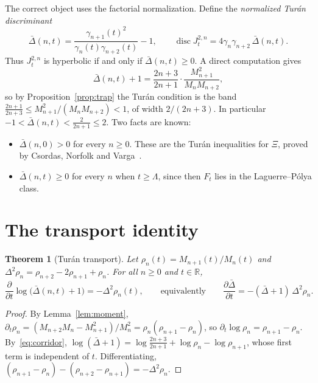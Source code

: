 \documentclass[11pt,a4paper]{article}
\newtheorem{theorem}{Theorem}
\theoremstyle{remark}
\begin{document}
The correct object uses the factorial normalization. Define the
\emph{normalized Tur\'an discriminant}
\begin{equation}
\bar\Delta(n,t)=\frac{\gamma_{n+1}(t)^2}{\gamma_n(t)\gamma_{n+2}(t)}-1,
\qquad
\operatorname{disc}J^{2,n}_t=4\gamma_n\gamma_{n+2}\,\bar\Delta(n,t).
\end{equation}
Thus $J^{2,n}_t$ is hyperbolic if and only if $\bar\Delta(n,t)\ge0$. A direct
computation gives
\begin{equation}\label{eq:corridor}
\bar\Delta(n,t)+1=\frac{2n+3}{2n+1}\cdot\frac{M_{n+1}^2}{M_nM_{n+2}} ,
\end{equation}
so by Proposition~\ref{prop:trap} the Tur\'an condition is the band
$\frac{2n+1}{2n+3}\le M_{n+1}^2/(M_nM_{n+2})<1$, of width $2/(2n+3)$. In
particular $-1<\bar\Delta(n,t)<\frac{2}{2n+1}\le2$. Two facts are known:
\begin{itemize}
\item $\bar\Delta(n,0)>0$ for every $n\ge0$. These are the Tur\'an
inequalities for $\Xi$, proved by Csordas, Norfolk and Varga~\cite{CNV1986}.
\item $\bar\Delta(n,t)\ge0$ for every $n$ when $t\ge\Lambda$, since then
$F_t$ lies in the Laguerre--Pólya class.
\end{itemize}

\section{The transport identity}

\begin{theorem}[Tur\'an transport]\label{thm:transport}
Let $\rho_n(t)=M_{n+1}(t)/M_n(t)$ and
$\Delta^2\rho_n=\rho_{n+2}-2\rho_{n+1}+\rho_n$. For all $n\ge0$ and
$t\in\mathbb R$,
\begin{equation}\label{eq:transport}
\frac{\partial}{\partial t}\log\bigl(\bar\Delta(n,t)+1\bigr)=-\Delta^2\rho_n(t),
\qquad\text{equivalently}\qquad
\frac{\partial\bar\Delta}{\partial t}=-(\bar\Delta+1)\,\Delta^2\rho_n .
\end{equation}
\end{theorem}

\begin{proof}
By Lemma~\ref{lem:moment},
$\partial_t\rho_n=(M_{n+2}M_n-M_{n+1}^2)/M_n^2=\rho_n(\rho_{n+1}-\rho_n)$,
so $\partial_t\log\rho_n=\rho_{n+1}-\rho_n$. By~\eqref{eq:corridor},
$\log(\bar\Delta+1)=\log\frac{2n+3}{2n+1}+\log\rho_n-\log\rho_{n+1}$, whose
first term is independent of $t$. Differentiating,
$(\rho_{n+1}-\rho_n)-(\rho_{n+2}-\rho_{n+1})=-\Delta^2\rho_n$.
\end{proof}
\end{document}
